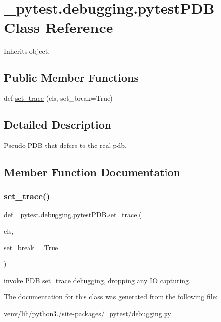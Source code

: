\hypertarget{class__pytest_1_1debugging_1_1pytest_p_d_b}{}\section{\+\_\+pytest.\+debugging.\+pytest\+P\+DB Class Reference}
\label{class__pytest_1_1debugging_1_1pytest_p_d_b}


Inherits object.

\subsection*{Public Member Functions}
\begin{DoxyCompactItemize}
\item 
def \hyperlink{class__pytest_1_1debugging_1_1pytest_p_d_b_aed919df93e35333b072fc8ab782f92bb}{set\+\_\+trace} (cls, set\+\_\+break=True)
\end{DoxyCompactItemize}


\subsection{Detailed Description}
\begin{DoxyVerb}Pseudo PDB that defers to the real pdb. \end{DoxyVerb}
 

\subsection{Member Function Documentation}
\mbox{\label{class__pytest_1_1debugging_1_1pytest_p_d_b_aed919df93e35333b072fc8ab782f92bb}} 
\subsubsection{\texorpdfstring{set\+\_\+trace()}{set\_trace()}}
{\footnotesize\ttfamily def \+\_\+pytest.\+debugging.\+pytest\+P\+D\+B.\+set\+\_\+trace (\begin{DoxyParamCaption}\item[{}]{cls,  }\item[{}]{set\+\_\+break = {\ttfamily True} }\end{DoxyParamCaption})}

\begin{DoxyVerb}invoke PDB set_trace debugging, dropping any IO capturing. \end{DoxyVerb}
 

The documentation for this class was generated from the following file\+:\begin{DoxyCompactItemize}
\item 
venv/lib/python3./site-\/packages/\+\_\+pytest/debugging.\+py\end{DoxyCompactItemize}
